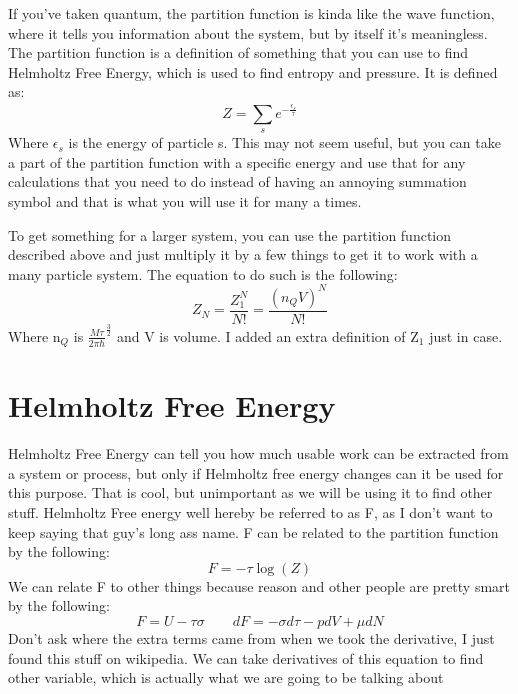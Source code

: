 \documentclass[arial]{article}
\begin{document}
If you've taken quantum, the partition function is kinda like the wave function, where it tells you information about the system, but by itself it's meaningless. The partition function is a definition of something that you can use to find Helmholtz Free Energy, which is used to find entropy and pressure. It is defined as:
\begin{equation}
Z=\sum_{s}^{}e^{-\frac{\epsilon_s}{\tau}}
\end{equation}
Where $\epsilon_s$ is the energy of particle s. This may not seem useful, but you can take a part of the partition function with a specific energy and use that for any calculations that you need to do instead of having an annoying summation symbol and that is what you will use it for many a times.
\vspace{3mm}

To get something for a larger system, you can use the partition function described above and just multiply it by a few things to get it to work with a many particle system. The equation to do such is the following:
\begin{equation}
Z_N=\frac{Z_1^N}{N!}=\frac{(n_QV)^N}{N!}
\end{equation}
Where n$_Q$ is $\frac{M\tau}{2\pi\hbar}^\frac{3}{2}$ and V is volume. I added an extra definition of Z$_1$ just in case.

\section*{Helmholtz Free Energy}
Helmholtz Free Energy can tell you how much usable work can be extracted from a system or process, but only if Helmholtz free energy changes can it be used for this purpose. That is cool, but unimportant as we will be using it to find other stuff. Helmholtz Free energy well hereby be referred to as F, as I don't want to keep saying that guy's long ass name.
F can be related to the partition function by the following:
\begin{equation}
F=-\tau \log(Z)
\end{equation}
We can relate F to other things because reason and other people are pretty smart by the following:
\begin{equation}
F=U-\tau\sigma\qquad
dF=-\sigma d\tau -pdV+\mu dN
\end{equation}
Don't ask where the extra terms came from when we took the derivative, I just found this stuff on wikipedia. We can take derivatives of this equation to find other variable, which is actually what we are going to be talking about \smiley
\end{document}
